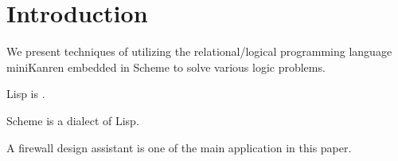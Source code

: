 \section{Introduction}
We present techniques of utilizing the relational/logical programming language miniKanren embedded in Scheme to solve various logic problems.

Lisp is .

Scheme is a dialect of Lisp.

A firewall design assistant is one of the main application in this paper.